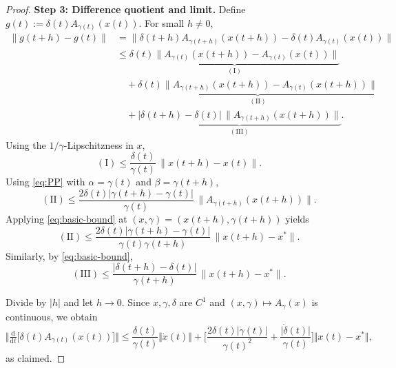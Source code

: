 \documentclass[10pt,a4paper]{amsart}
\begin{document}
\begin{proof}
\textbf{Step 3: Difference quotient and limit.}
Define $g(t):=\delta(t)A_{\gamma(t)}(x(t))$. For small $h\neq0$,
\[
\begin{aligned}
\|g(t+h)-g(t)\|
&= \|\delta(t+h)A_{\gamma(t+h)}(x(t+h))-\delta(t)A_{\gamma(t)}(x(t))\|\\
&\le \underbrace{\delta(t)\|A_{\gamma(t)}(x(t+h))-A_{\gamma(t)}(x(t))\|}_{\mathrm{(I)}}\\
&\quad + \underbrace{\delta(t)\|A_{\gamma(t+h)}(x(t+h))-A_{\gamma(t)}(x(t+h))\|}_{\mathrm{(II)}}\\
&\quad + \underbrace{|\delta(t+h)-\delta(t)|\,\|A_{\gamma(t+h)}(x(t+h))\|}_{\mathrm{(III)}}.
\end{aligned}
\]
Using the $1/\gamma$-Lipschitzness in $x$,
\[
\mathrm{(I)} \le \frac{\delta(t)}{\gamma(t)}\,\|x(t+h)-x(t)\|.
\]
Using \eqref{eq:PP} with $\alpha=\gamma(t)$ and $\beta=\gamma(t+h)$,
\[
\mathrm{(II)} \le \frac{2\delta(t)|\gamma(t+h)-\gamma(t)|}{\gamma(t)}\,\|A_{\gamma(t+h)}(x(t+h))\|.
\]
Applying \eqref{eq:basic-bound} at $(x,\gamma)=(x(t+h),\gamma(t+h))$ yields
\[
\mathrm{(II)} \le \frac{2\delta(t)|\gamma(t+h)-\gamma(t)|}{\gamma(t)\gamma(t+h)}\,\|x(t+h)-x^*\|.
\]
Similarly, by \eqref{eq:basic-bound},
\[
\mathrm{(III)} \le \frac{|\delta(t+h)-\delta(t)|}{\gamma(t+h)}\,\|x(t+h)-x^*\|.
\]

Divide by $|h|$ and let $h\to0$. Since $x,\gamma,\delta$ are $C^1$ and $(x,\gamma)\mapsto A_\gamma(x)$ is continuous, we obtain
\[
\Big\Vert \tfrac{\mathrm{d}}{\mathrm{d}t}\big[\delta(t)A_{\gamma(t)}(x(t))\big] \Big\Vert
\le \frac{\delta(t)}{\gamma(t)}\Vert \dot{x}(t) \Vert
+ \Big[\frac{2\delta(t)\vert \dot{\gamma}(t)\vert}{\gamma(t)^2}
+ \frac{\vert \dot{\delta}(t)\vert}{\gamma(t)}\Big]\Vert x(t)-x^* \Vert,
\]
as claimed.
\end{proof}
\end{document}
